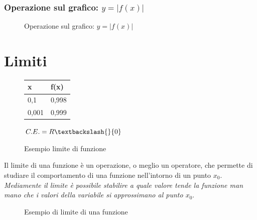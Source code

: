 \subsubsection{Operazione sul grafico: $y=|f(x)|$}
\begin{figure}[!ht]
	\centering
	\caption{Operazione sul grafico: $y=|f(x)|$}
\end{figure}


\section{Limiti}
\begin{figure}[!ht]
	\centering
	\begin{tabular}{|l|l|}
		\hline
		x&f(x)\\\hline\hline
		0,1& 0,998\\
		0,001&0,999\\\hline
	\end{tabular}
	$C.E.=R\textbackslash{}\{0\}$
	\caption{Esempio limite di funzione}
\end{figure}
Il limite di una funzione è un operazione, o meglio un operatore, che permette
di studiare il comportamento di una funzione nell'intorno di un punto $x_0$.\\
\textit{Mediamente il limite è possibile stabilire a quale valore tende la
funzione man mano che i valori della variabile si approssimano al punto $x_0$}.
\begin{figure}[!ht]
	\centering
	\caption{Esempio di limite di una funzione}
\end{figure}
